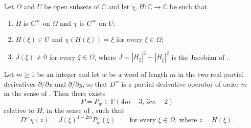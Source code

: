 \begin{lemma}
Let $\Omega$ and $U$ be open subsets of $\mathbb{C}$ and let
$\chi,H\colon\mathbb{C}\to\mathbb{C}$ be such that
\begin{enumerate}
\item[(a)] $H$ is $C^\infty$ on $\Omega$ and $\chi$ is $C^\infty$ on $U$;
\item[(b)] $H(\xi)\in U$ and $\chi(H(\xi))=\xi$ for every $\xi\in\Omega$;
\item[(c)] $J(\xi)\neq0$ for every $\xi\in\Omega$, where
$J=|H_\xi|^2-|H_{\bar\xi}|^2$ is the Jacobian of .
\end{enumerate}
Let $m\ge1$ be an integer and let $w$ be a word of length $m$ in the two real
partial derivatives $\partial/\partial x$ and $\partial/\partial y$, so that
$D^{w}$ is a partial derivative operator of order $m$ in the sense of
.  Then there exists
\[
  P=P_{w}\in\mathbb{P}(4m-3,\,3m-2)
\]
relative to $H$, in the sense of , such that
\[
  D^{w}\chi(z)=J(\xi)^{1-2m}P_{w}(\xi)
  \qquad\text{for every }\xi\in\Omega,\ \text{where }z=H(\xi).
\]
\end{lemma}
